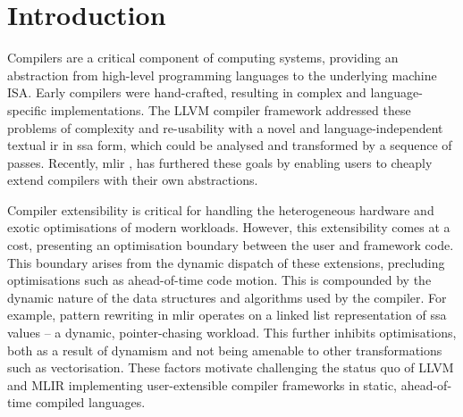 \chapter{Introduction}
\label{chap:introduction}






Compilers are a critical component of computing systems, providing an abstraction %
from high-level programming languages to the underlying machine ISA.
Early compilers were hand-crafted, resulting in complex and language-specific implementations. %
The LLVM compiler framework \cite{lattnerLLVMCompilationFramework2004} addressed these problems of complexity and re-usability with a novel and language-independent textual \ac{ir} in \ac{ssa} form, which could be analysed and transformed by a sequence of passes.
Recently, \ac{mlir} \cite{lattnerMLIRScalingCompiler2021a}, has furthered these goals by enabling users to cheaply extend compilers with their own abstractions. %





Compiler extensibility is critical for handling the heterogeneous hardware and exotic optimisations of modern workloads.
However, this extensibility comes at a cost, presenting an optimisation boundary between the user and framework code. This boundary arises from the dynamic dispatch of these extensions, precluding optimisations such as ahead-of-time code motion.
This is compounded by the dynamic nature of the data structures and algorithms used by the compiler. For example, pattern rewriting in \ac{mlir} operates on a linked list representation of \ac{ssa} values -- a dynamic, pointer-chasing workload.
This further inhibits optimisations, both as a result of dynamism and not being amenable to other transformations such as vectorisation.
These factors motivate challenging the status quo of LLVM and MLIR implementing user-extensible compiler frameworks in static, ahead-of-time compiled languages.






